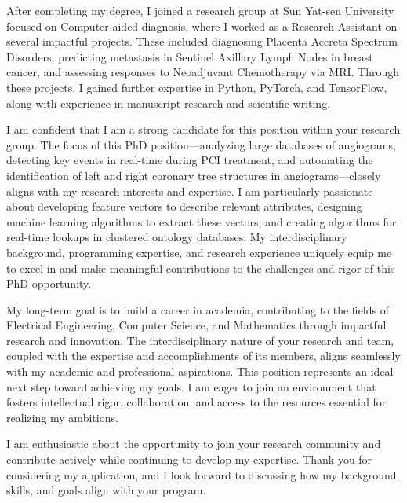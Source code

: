\documentclass[11pt,a4paper, final]{moderncv}
\newcommand{\spacesubsection}{\vspace{0.2cm}}
\begin{document}
After completing my degree, 
I joined a research group at Sun Yat-sen University focused on Computer-aided diagnosis, 
where I worked as a Research Assistant on several impactful projects. 
These included diagnosing Placenta Accreta Spectrum Disorders, 
predicting metastasis in Sentinel Axillary Lymph Nodes in breast cancer, 
and assessing responses to Neoadjuvant Chemotherapy via MRI. 
Through these projects, I gained further expertise in Python, PyTorch, and TensorFlow, 
along with experience in manuscript research and scientific writing.

I am confident that I am a strong candidate for this position within your research group. 
The focus of this PhD position—analyzing large databases of angiograms, detecting key events in real-time during PCI treatment, and automating the identification of left and right coronary tree structures in angiograms—closely aligns with my research interests and expertise. 
I am particularly passionate about developing feature vectors to describe relevant attributes, 
designing machine learning algorithms to extract these vectors, 
and creating algorithms for real-time lookups in clustered ontology databases. 
My interdisciplinary background, programming expertise, 
and research experience uniquely equip me to excel in and make meaningful contributions 
to the challenges and rigor of this PhD opportunity.

My long-term goal is to build a career in academia, 
contributing to the fields of Electrical Engineering, Computer Science, 
and Mathematics through impactful research and innovation. 
The interdisciplinary nature of your research and team, coupled with the expertise and accomplishments of its members, 
aligns seamlessly with my academic and professional aspirations. 
This position represents an ideal next step toward achieving my goals. 
I am eager to join an environment that fosters intellectual rigor, collaboration, 
and access to the resources essential for realizing my ambitions.

I am enthusiastic about the opportunity to join your research community 
and contribute actively while continuing to develop my expertise. 
Thank you for considering my application, 
and I look forward to discussing how my background, skills, and goals align with your program.


\makeletterclosing
\end{document}

